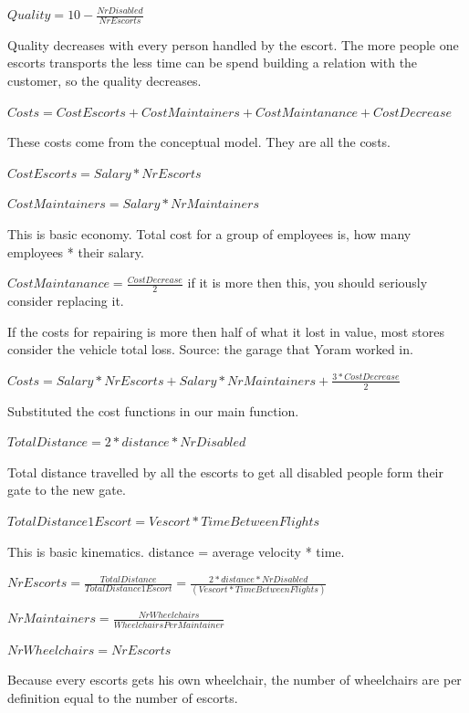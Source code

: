 \documentclass[a4paper, 11pt, notitlepage]{report}
\begin{document}
\begin{description}
	\item $Quality = 10-\frac{NrDisabled}{NrEscorts}$
	\item[Explanation:] Quality decreases with every person handled by the escort. The more people one escorts transports the less time can be spend building a relation with the customer, so the quality decreases. 
	\item $Costs = CostEscorts + CostMaintainers + CostMaintanance + CostDecrease$
	\item[Explanation:] These costs come from the conceptual model. They are all the costs.
	\item $CostEscorts = Salary * NrEscorts$
	\item $CostMaintainers = Salary * NrMaintainers$
	\item[Explanation:] This is basic economy. Total cost for a group of employees is, how many employees * their salary.
	\item $CostMaintanance = \frac{CostDecrease}{2} $ if it is more then this, you should seriously consider replacing it.
	\item[Explanation:] If the costs for repairing is more then half of what it lost in value, most stores consider the vehicle total loss. Source: the garage that Yoram worked in.
	\item
	\item $Costs = Salary * NrEscorts + Salary * NrMaintainers + \frac{3* CostDecrease}{2}$
	\item[Explanation:] Substituted the cost functions in our main function.
	\item $TotalDistance = 2*distance*NrDisabled$
	\item[Explanation:] Total distance travelled by all the escorts to get all disabled people form their gate to the new gate.
	\item $TotalDistance1Escort = Vescort*TimeBetweenFlights$
	\item[Explanation:] This is basic kinematics. distance = average velocity * time.
	\item $NrEscorts = \frac{TotalDistance}{TotalDistance1Escort} = \frac{2*distance*NrDisabled}{(Vescort*TimeBetweenFlights)}$
	\item
	\item $NrMaintainers = \frac{NrWheelchairs}{WheelchairsPerMaintainer}$
	\item $NrWheelchairs = NrEscorts$
	\item[Explanation:] Because every escorts gets his own wheelchair, the number of wheelchairs are per definition equal to the number of escorts.

\end{description}
\end{document}
